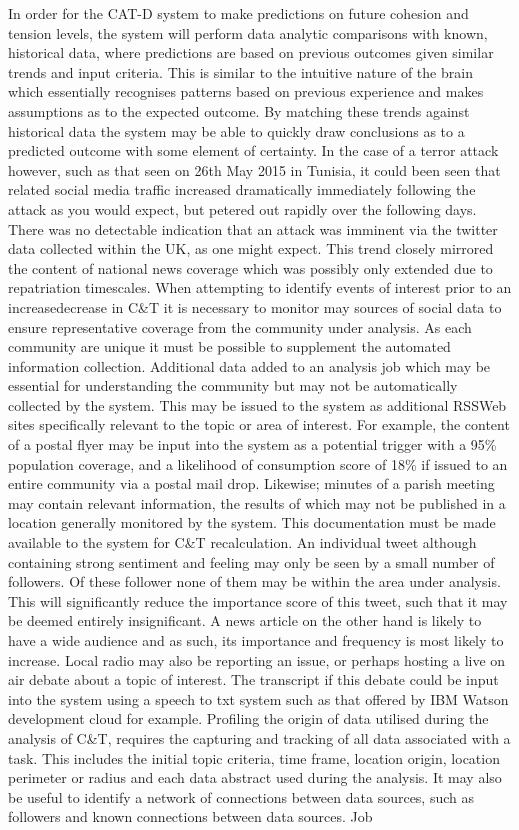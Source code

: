 In order for the C\+A\+T-\/\+D system to make predictions on future cohesion and tension levels, the system will perform data analytic comparisons with known, historical data, where predictions are based on previous outcomes given similar trends and input criteria. This is similar to the intuitive nature of the brain which essentially recognises patterns based on previous experience and makes assumptions as to the expected outcome. By matching these trends against historical data the system may be able to quickly draw conclusions as to a predicted outcome with some element of certainty. In the case of a terror attack however, such as that seen on 26th May 2015 in Tunisia, it could been seen that related social media traffic increased dramatically immediately following the attack as you would expect, but petered out rapidly over the following days. There was no detectable indication that an attack was imminent via the twitter data collected within the U\+K, as one might expect. This trend closely mirrored the content of national news coverage which was possibly only extended due to repatriation timescales. When attempting to identify events of interest prior to an increasedecrease in C\&T it is necessary to monitor may sources of social data to ensure representative coverage from the community under analysis. As each community are unique it must be possible to supplement the automated information collection. Additional data added to an analysis job which may be essential for understanding the community but may not be automatically collected by the system. This may be issued to the system as additional R\+S\+S\+Web sites specifically relevant to the topic or area of interest. For example, the content of a postal flyer may be input into the system as a potential trigger with a 95\% population coverage, and a likelihood of consumption score of 18\% if issued to an entire community via a postal mail drop. Likewise; minutes of a parish meeting may contain relevant information, the results of which may not be published in a location generally monitored by the system. This documentation must be made available to the system for C\&T recalculation. An individual tweet although containing strong sentiment and feeling may only be seen by a small number of followers. Of these follower none of them may be within the area under analysis. This will significantly reduce the importance score of this tweet, such that it may be deemed entirely insignificant. A news article on the other hand is likely to have a wide audience and as such, its importance and frequency is most likely to increase. Local radio may also be reporting an issue, or perhaps hosting a live on air debate about a topic of interest. The transcript if this debate could be input into the system using a speech to txt system such as that offered by I\+B\+M Watson development cloud for example. Profiling the origin of data utilised during the analysis of C\&T, requires the capturing and tracking of all data associated with a task. This includes the initial topic criteria, time frame, location origin, location perimeter or radius and each data abstract used during the analysis. It may also be useful to identify a network of connections between data sources, such as followers and known connections between data sources. Job 